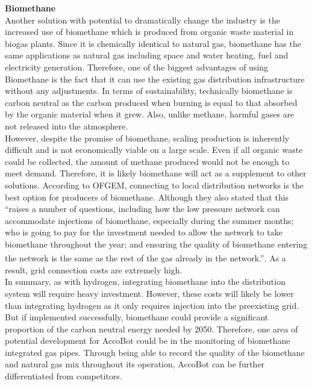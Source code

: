 \documentclass[11pt]{article}		%
\newcommand{\supercite}[1]{\textsuperscript{\cite{#1}}}		%
\begin{document}
            \textbf{Biomethane} \\
            Another solution with potential to dramatically change the industry is the increased use of biomethane which is produced from organic waste material in biogas plants. Since it is chemically identical to natural gas, biomethane has the same applications as natural gas including space and water heating, fuel and electricity generation. Therefore, one of the biggest advantages of using Biomethane is the fact that it can use the existing gas distribution infrastructure without any adjustments. In terms of sustainability, technically biomethane is carbon neutral as the carbon produced when burning is equal to that absorbed by the organic material when it grew. Also, unlike methane, harmful gases are not released into the atmosphere.\\
    	    \hspace*{3ex}However, despite the promise of biomethane, scaling production is inherently difficult and is not economically viable on a large scale. Even if all organic waste could be collected, the amount of methane produced would not be enough to meet demand. Therefore, it is likely biomethane will act as a supplement to other solutions. According to OFGEM, connecting to local distribution networks is the best option for producers of biomethane. Although they also stated that this “raises a number of questions, including how the low pressure network can accommodate injections of biomethane, especially during the summer months; who is going to pay for the investment needed to allow the network to take biomethane throughout the year; and ensuring the quality of biomethane entering the network is the same as the rest of the gas already in the network.”\supercite{biomethaneof}. As a result, grid connection costs are extremely high.\\
        	\hspace*{3ex}In summary, as with hydrogen, integrating biomethane into the distribution system will require heavy investment. However, these costs will likely be lower than integrating hydrogen as it only requires injection into the preexisting grid. But if implemented successfully, biomethane could provide a significant proportion of the carbon neutral energy needed by 2050. Therefore, one area of potential development for AccoBot could be in the monitoring of biomethane integrated gas pipes. Through being able to record the quality of the biomethane and natural gas mix throughout its operation, AccoBot can be further differentiated from competitors. 
    
\end{document}
